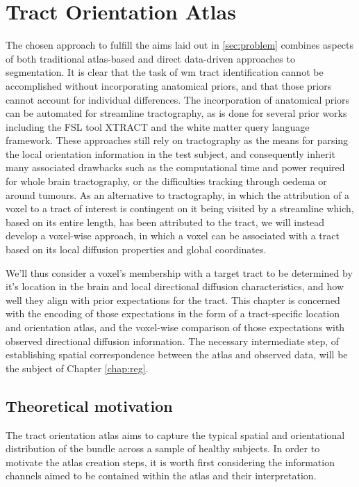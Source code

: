 \chapter{Tract Orientation Atlas}
\label{chap:atlas}


The chosen approach to fulfill the aims laid out in \ref{sec:problem} combines aspects of both traditional atlas-based and direct data-driven approaches to segmentation.
It is clear that the task of \gls{wm} tract identification cannot be accomplished without incorporating anatomical priors, and that those priors cannot account for individual differences.
The incorporation of anatomical priors can be automated for streamline tractography, as is done for several prior works including the FSL tool XTRACT\autocite{Warrington2020} and the white matter query language framework.\autocite{Wassermann2016}
These approaches still rely on tractography as the means for parsing the local orientation information in the test subject, and consequently inherit many associated drawbacks such as the computational time and power required for whole brain tractography, or the difficulties tracking through oedema or around tumours.
As an alternative to tractography, in which the attribution of a voxel to a tract of interest is contingent on it being visited by a streamline which, based on its entire length, has been attributed to the tract, we will instead develop a voxel-wise approach, in which a voxel can be associated with a tract based on its local diffusion properties and global coordinates.

We'll thus consider a voxel's membership with a target tract to be determined by it's location in the brain and local directional diffusion characteristics, and how well they align with prior expectations for the tract.
This chapter is concerned with the encoding of those expectations in the form of a tract-specific location and orientation atlas, and the voxel-wise comparison of those expectations with observed directional diffusion information.
The necessary intermediate step, of establishing spatial correspondence between the atlas and observed data, will be the subject of Chapter \ref{chap:reg}.

\section{Theoretical motivation}

The tract orientation atlas aims to capture the typical spatial and orientational distribution of the bundle across a sample of healthy subjects.
In order to motivate the atlas creation steps, it is worth first considering the information channels aimed to be contained within the atlas and their interpretation.

